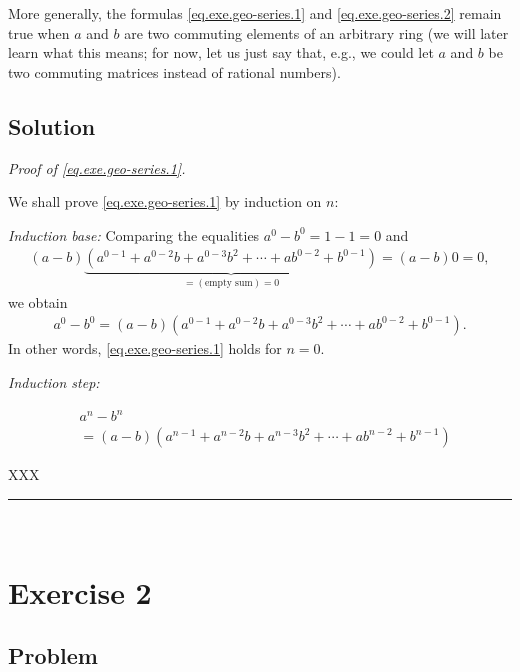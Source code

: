 \documentclass[paper=a4, fontsize=12pt]{scrartcl} %
\newcommand{\tup}[1]{\left( #1 \right)}
\newcommand{\horrule}[1]{\rule{\linewidth}{#1}} %
\theoremstyle{plainsl}
\theoremstyle{definition}
\theoremstyle{remark}
\begin{document}
More generally, the formulas
\eqref{eq.exe.geo-series.1} and \eqref{eq.exe.geo-series.2}
remain true when $a$ and $b$ are two commuting elements of an
arbitrary ring
(we will later learn what this means; for now, let us
just say that, e.g., we could let $a$ and $b$ be two commuting
matrices instead of rational numbers).

\subsection{Solution}

\textit{Proof of \eqref{eq.exe.geo-series.1}.}

We shall prove \eqref{eq.exe.geo-series.1} by induction on $n$:

\textit{Induction base:}
Comparing the equalities $a^0 - b^0 = 1 - 1 = 0$ and
\begin{align*}
\tup{a-b}
\underbrace{\tup{ a^{0-1} + a^{0-2} b + a^{0-3} b^2 + \cdots + a b^{0-2} + b^{0-1} }}_{=\tup{\text{empty sum}} = 0}
= \tup{a-b} 0 = 0,
\end{align*}
we obtain
\begin{align*}
a^0 - b^0
= \tup{a-b} \tup{ a^{0-1} + a^{0-2} b + a^{0-3} b^2 + \cdots + a b^{0-2} + b^{0-1} } .
\end{align*}
In other words, \eqref{eq.exe.geo-series.1} holds for $n = 0$.

\textit{Induction step:}


\begin{align}
& a^n - b^n \nonumber \\
& = \tup{a-b} \tup{ a^{n-1} + a^{n-2} b + a^{n-3} b^2 + \cdots + a b^{n-2} + b^{n-1} }
\end{align}


XXX

\horrule{0.3pt} \\[0.4cm]

\section{Exercise 2}

\subsection{Problem}
\end{document}
